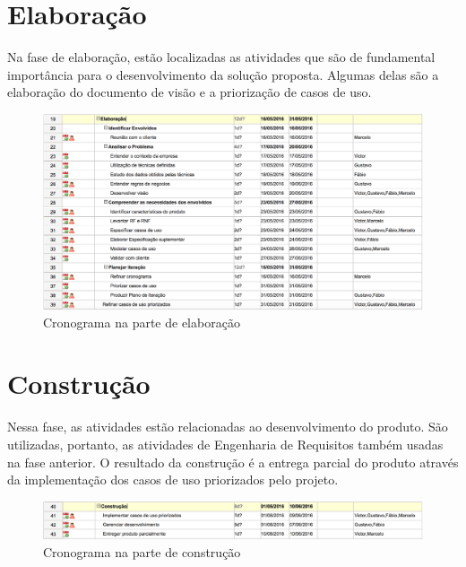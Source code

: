 \clearpage{}

\section{Elaboração}

Na fase de elaboração, estão localizadas as atividades que são de fundamental importância para o desenvolvimento da solução proposta. Algumas delas são a elaboração do documento de visão e a priorização de casos de uso.

\begin{figure}[htb]
\centering
  \includegraphics[keepaspectratio=true,scale=0.5]
  {figuras/cronograma_elaboracao.eps}
  \caption{Cronograma na parte de elaboração}
  \label{schedule-elab}
\end{figure}

\clearpage{}

\section{Construção}

Nessa fase, as atividades estão relacionadas ao desenvolvimento do produto. São utilizadas, portanto, as atividades de Engenharia de Requisitos também usadas na fase anterior. O resultado da construção é a entrega parcial do produto através da implementação dos casos de uso priorizados pelo projeto.

\begin{figure}[htb]
\centering
  \includegraphics[keepaspectratio=true,scale=0.5]
  {figuras/cronograma_construcao.eps}
  \caption{Cronograma na parte de construção}
  \label{schedule-construct}
\end{figure}

\clearpage{}

